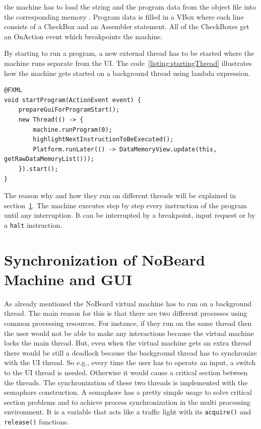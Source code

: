  the machine has to load the string and the program data from the object file into the corresponding memory . Program data is filled in a VBox where each line consists of a CheckBox and an Assembler statement. All of the CheckBoxes get an OnAction event which  breakpoints  the machine. 

By starting to run a program, a new external thread has to be started where the machine runs separate from the UI. The code~\ref{listing:startingThread} illustrates how the machine gets started on a background thread using  lambda expression.
\begin{lstlisting}[caption={Starting the machine on a new thread},label=listing:startingThread]
@FXML
void startProgram(ActionEvent event) {
    prepareGuiForProgramStart();
    new Thread(() -> {
        machine.runProgram(0);
        highlightNextInstructionToBeExecuted();
        Platform.runLater(() -> DataMemoryView.update(this, getRawDataMemoryList()));
    }).start();
}
\end{lstlisting}
The reason why and how they run on different threads will be explained in section~\ref{sec:synchronization}. The machine executes step by step every instruction of the program until any interruption. It can be interrupted by a breakpoint, input request or by a \lstinline$halt$ instruction. 

\section{Synchronization of NoBeard Machine and GUI}
\label{sec:synchronization} 
As already mentioned the NoBeard virtual machine has to run on a background thread. The main reason for this is that there are two different processes using common processing resources. For instance, if they run on the same thread then the user would not be able to make any interactions because the virtual machine locks the main thread. But, even when the virtual machine gets an extra thread there would be still a deadlock because the background thread has to synchronize with the UI thread. So e.g., every time the user has to operate an input, a switch to the UI thread is needed. Otherwise it would cause a critical section between the threads. The synchronization of these two threads is implemented with the semaphore construction. A semaphore has a pretty simple usage to solve critical section problems and to achieve process synchronization in the multi processing environment. It is a variable that acts like a traffic light with its \lstinline$acquire()$ and \lstinline$release()$ functions.

